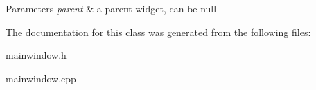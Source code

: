 \begin{DoxyParams}{Parameters}
{\em parent} & a parent widget, can be null \\
\hline
\end{DoxyParams}


The documentation for this class was generated from the following files\-:\begin{DoxyCompactItemize}
\item 
\hyperlink{mainwindow_8h}{mainwindow.\-h}\item 
mainwindow.\-cpp\end{DoxyCompactItemize}
